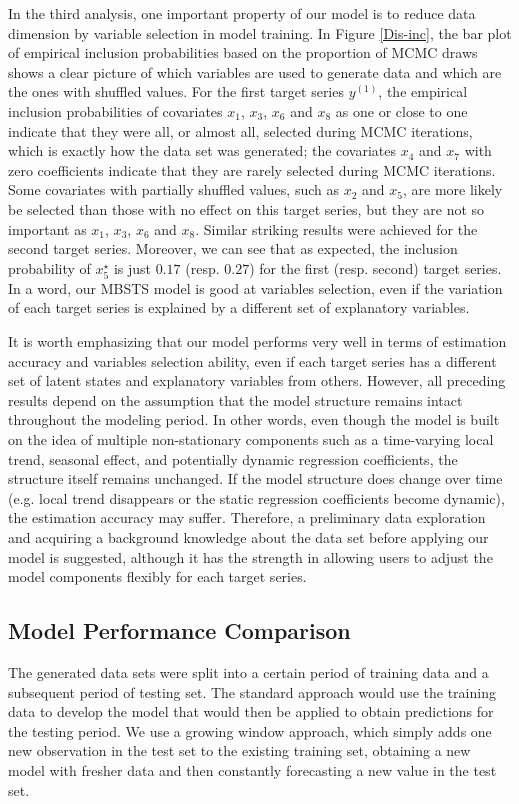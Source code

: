 \documentclass[twoside,11pt]{article}
\begin{document}
In the third analysis, one important property of our model is to reduce data dimension by variable selection in model training. In Figure \ref{Dis-inc}, the bar plot of empirical inclusion probabilities based on the proportion of MCMC draws shows a clear picture of which variables are used to generate data and which are the ones with shuffled values.
For the first target series $y^{(1)}$, the empirical inclusion probabilities of covariates $x_1$, $x_3$, $x_6$ and $x_8$ as one or close to one indicate that they were all, or almost all, selected during MCMC iterations,
 which is exactly how the data set was generated; the covariates $x_4$ and $x_7$ with zero coefficients indicate that they are rarely selected during MCMC iterations. Some covariates with partially shuffled values, such as $x_2$ and $x_5$, are more likely be selected than those with no effect on this target series, but they are not so important as $x_1$, $x_3$, $x_6$ and $x_8$. Similar striking results were achieved for the second target series. Moreover, we can see that as expected, the inclusion probability of $x_5^\star$ is just $0.17$ (resp. $0.27$) for the first (resp. second) target series. In a word, our MBSTS model is good at variables selection, even if the variation of each target series is explained by a different set of explanatory variables.

It is worth emphasizing that our model performs very well in terms of estimation accuracy and variables selection ability, even if each target series has a different set of latent states and explanatory variables from others. However, all preceding results depend on the assumption that the model structure remains intact throughout the modeling period. In other words, even though the model is built on the idea of multiple non-stationary components such as a time-varying local trend, seasonal effect, and potentially dynamic regression coefficients, the structure itself remains unchanged. If the model structure does change over time (e.g. local trend disappears or the static regression coefficients become dynamic), the estimation accuracy may suffer. Therefore, a preliminary data exploration and acquiring a background knowledge about the data set before applying our model is suggested, although it has the strength in allowing users to adjust the model components flexibly for each target series.

\subsection{Model Performance Comparison}
The generated data sets were split into a certain period of training data and a subsequent period of testing set. The standard approach would use the training data to develop the model that would then be applied to obtain predictions for the testing period. We use a growing window approach, which simply adds one new observation in the test set to the existing training set, obtaining a new model with fresher data and then constantly forecasting a new value in the test set.
\end{document}
